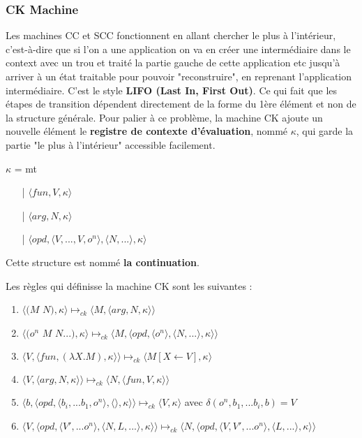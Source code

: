 \documentclass[10pt,a4paper]{article}
\begin{document}
				\subsubsection{CK Machine}
					
					Les machines CC et SCC fonctionnent en allant chercher le plus à l'intérieur, c'est-à-dire que si l'on a une application on va en créer une intermédiaire dans le context avec un trou et traité la partie gauche de cette application etc jusqu'à arriver à un état traitable pour pouvoir "reconstruire", en reprenant l'application intermédiaire. C'est le style \textbf{ LIFO (Last In, First Out)}. Ce qui fait que les étapes de transition dépendent directement de la forme du 1ère élément et non de la structure générale.
					\smallbreak
					Pour palier à ce problème, la machine CK ajoute un nouvelle élément le \textbf{registre de contexte d'évaluation}, nommé $\kappa$, qui garde la partie "le plus à l'intérieur" accessible facilement.
					\smallbreak
					
					$\kappa$ = mt
					\begin{itemize}
						\item[|] $\langle fun,V,\kappa \rangle$
						\item[|] $\langle arg,N,\kappa \rangle$
						\item[|] $\langle opd,\langle V,...,V,o^{n}\rangle,\langle N,... \rangle,\kappa \rangle$
					\end{itemize}
					
					Cette structure est nommé \textbf{la continuation}.
					\medbreak
					
					Les règles qui définisse la machine CK sont les suivantes :
					\begin{enumerate}
						\item $\langle(M$ $N),\kappa\rangle \longmapsto_{ck} \langle M,\langle arg,N,\kappa\rangle\rangle$
						\item $\langle(o^{n}$ $M$ $N...),\kappa\rangle \longmapsto_{ck} \langle M,\langle opd,\langle o^{n}\rangle,\langle N,...\rangle,\kappa\rangle\rangle$
						\item $\langle V,\langle fun,(\lambda X.M),\kappa \rangle \rangle \longmapsto_{ck} \langle M[X \leftarrow V],\kappa\rangle$
						\item $\langle V,\langle arg,N,\kappa \rangle \rangle \longmapsto_{ck} \langle N,\langle fun,V,\kappa \rangle \rangle$
						\item $\langle b,\langle opd,\langle b_{i},...b_{1},o^{n}\rangle,\langle\rangle,\kappa\rangle\rangle \longmapsto_{ck} \langle V,\kappa\rangle$ avec $\delta(o^{n},b_{1},...b_{i},b) = V$
						\item $\langle V,\langle opd,\langle V',...o^{n}\rangle,\langle N,L,...\rangle,\kappa\rangle\rangle \longmapsto_{ck} \langle N,\langle opd,\langle V,V',...o^{n}\rangle,\langle L,...\rangle,\kappa\rangle\rangle$
					\end{enumerate}
					\bigbreak
					
\end{document}
